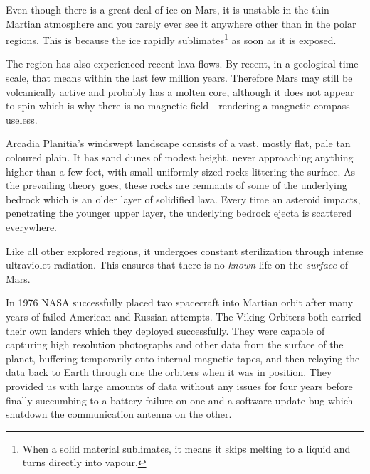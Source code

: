 Even though there is a great deal of ice on Mars, it is unstable in the thin Martian atmosphere and you rarely ever see it anywhere other than in the polar regions. This is because the ice rapidly sublimates\footnote{When a solid material sublimates, it means it skips melting to a liquid and turns directly into vapour.} as soon as it is exposed.

The region has also experienced recent lava flows. By recent, in a geological time scale, that means within the last few million years. Therefore Mars may still be volcanically active and probably has a molten core, although it does not appear to spin which is why there is no magnetic field - rendering a magnetic compass useless.

    {}
    {}
    {}
    \stopcombination

Arcadia Planitia's windswept landscape consists of a vast, mostly flat, pale tan coloured plain. It has sand dunes of modest height, never approaching anything higher than a few feet, with small uniformly sized rocks littering the surface. As the prevailing theory goes, these rocks are remnants of some of the underlying bedrock which is an older layer of solidified lava. Every time an asteroid impacts, penetrating the younger upper layer, the underlying bedrock ejecta is scattered everywhere.

Like all other explored regions, it undergoes constant sterilization through intense ultraviolet radiation. This ensures that there is no {\it known} life on the {\it surface} of Mars.


In 1976 NASA successfully placed two spacecraft into Martian orbit after many years of failed American and Russian attempts. The Viking Orbiters both carried their own landers which they deployed successfully. They were capable of capturing high resolution photographs and other data from the surface of the planet, buffering temporarily onto internal magnetic tapes, and then relaying the data back to Earth through one the orbiters when it was in position. They provided us with large amounts of data without any issues for four years before finally succumbing to a battery failure on one and a software update bug which shutdown the communication antenna on the other.

